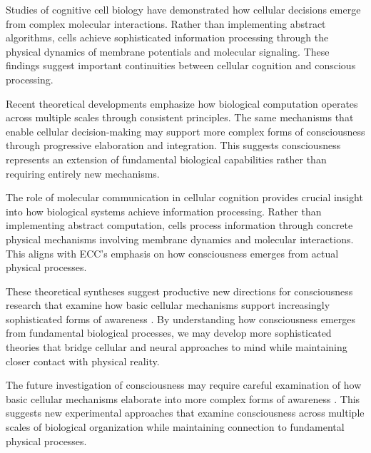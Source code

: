 Studies of cognitive cell biology \cite{Mitchell2016} have demonstrated how cellular decisions emerge from complex molecular interactions. Rather than implementing abstract algorithms, cells achieve sophisticated information processing through the physical dynamics of membrane potentials and molecular signaling. These findings suggest important continuities between cellular cognition and conscious processing.

Recent theoretical developments \cite{Fields2020} emphasize how biological computation operates across multiple scales through consistent principles. The same mechanisms that enable cellular decision-making may support more complex forms of consciousness through progressive elaboration and integration. This suggests consciousness represents an extension of fundamental biological capabilities rather than requiring entirely new mechanisms.

The role of molecular communication in cellular cognition \cite{Manicka2019} provides crucial insight into how biological systems achieve information processing. Rather than implementing abstract computation, cells process information through concrete physical mechanisms involving membrane dynamics and molecular interactions. This aligns with ECC's emphasis on how consciousness emerges from actual physical processes.

These theoretical syntheses suggest productive new directions for consciousness research that examine how basic cellular mechanisms support increasingly sophisticated forms of awareness \cite{Baluska2016}. By understanding how consciousness emerges from fundamental biological processes, we may develop more sophisticated theories that bridge cellular and neural approaches to mind while maintaining closer contact with physical reality.

The future investigation of consciousness may require careful examination of how basic cellular mechanisms elaborate into more complex forms of awareness \cite{Lyon2015}. This suggests new experimental approaches that examine consciousness across multiple scales of biological organization while maintaining connection to fundamental physical processes.